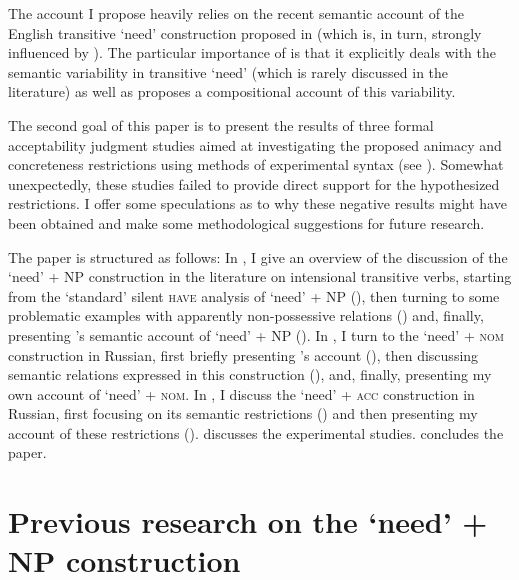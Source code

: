 \documentclass[output=paper,colorlinks,citecolor=brown]{langscibook}
\begin{document}
The account I propose heavily relies on the recent semantic account of the English transitive `need' construction proposed in \citet{Zaroukian.Beller2013} (which is, in turn, strongly influenced by \citealt{Vikner.Jensen2002}). The particular importance of \citet{Zaroukian.Beller2013} is that it explicitly deals with the semantic variability in transitive `need' (which is rarely discussed in the literature) as well as proposes a compositional account of this variability.

The second goal of this paper is to present the results of three formal acceptability judgment studies aimed at investigating the proposed animacy and concreteness restrictions using methods of experimental syntax (see \citealt{Sprouse.Hornstein2013}). Somewhat unexpectedly, these studies failed to provide direct support for the hypothesized restrictions. I offer some speculations as to why these negative results might have been obtained and make some methodological suggestions for future research.

The paper is structured as follows: In , I give an overview of the discussion of the `need' + NP construction in the literature on intensional transitive verbs, starting from the `standard' silent \textsc{have} analysis of `need' + NP (), then turning to some problematic examples with apparently non-possessive relations () and, finally, presenting \citeauthor{Zaroukian.Beller2013}'s \citeyearpar{Zaroukian.Beller2013} semantic account of `need' + NP (). In , I turn to the `need' + \textsc{nom} construction in Russian, first briefly presenting \citeauthor{Harves2008}'s \citeyearpar{Harves2008} account (), then discussing semantic relations expressed in this construction (), and, finally, presenting my own account of `need' + \textsc{nom}. In , I discuss the `need' + \textsc{acc} construction in Russian, first focusing on its semantic restrictions () and then presenting my account of these restrictions ().  discusses the experimental studies.  concludes the paper.

\section{Previous research on the `need' + NP construction\label{section-background}}
\end{document}
